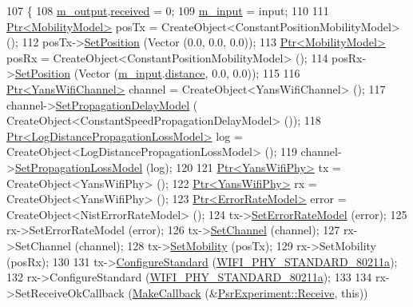 \begin{DoxyCode}
107 \{
108   \hyperlink{classPsrExperiment_ae7fa4520d7fbf118bbf399386b4295c4}{m\_output}.\hyperlink{structPsrExperiment_1_1Output_a51060ffe2dcfb57a68d023b82a16602c}{received} = 0;
109   \hyperlink{classPsrExperiment_a8892dc34592cc5f5f51dbf172078d7a3}{m\_input} = input;
110 
111   \hyperlink{classns3_1_1Ptr}{Ptr<MobilityModel>} posTx = CreateObject<ConstantPositionMobilityModel> ();
112   posTx->\hyperlink{classns3_1_1MobilityModel_ac584b3d5a309709d2f13ed6ada1e7640}{SetPosition} (Vector (0.0, 0.0, 0.0));
113   \hyperlink{classns3_1_1Ptr}{Ptr<MobilityModel>} posRx = CreateObject<ConstantPositionMobilityModel> ();
114   posRx->\hyperlink{classns3_1_1MobilityModel_ac584b3d5a309709d2f13ed6ada1e7640}{SetPosition} (Vector (\hyperlink{classPsrExperiment_a8892dc34592cc5f5f51dbf172078d7a3}{m\_input}.\hyperlink{structPsrExperiment_1_1Input_a74721efa5a648bbae3524197abccb5dd}{distance}, 0.0, 0.0));
115 
116   \hyperlink{classns3_1_1Ptr}{Ptr<YansWifiChannel>} channel = CreateObject<YansWifiChannel> ();
117   channel->\hyperlink{classns3_1_1YansWifiChannel_a51ebdd5a1d897dc46cf9783ac2879b98}{SetPropagationDelayModel} (
      CreateObject<ConstantSpeedPropagationDelayModel> ());
118   \hyperlink{classns3_1_1Ptr}{Ptr<LogDistancePropagationLossModel>} log = 
      CreateObject<LogDistancePropagationLossModel> ();
119   channel->\hyperlink{classns3_1_1YansWifiChannel_ad2f92be1fb34be0075141cbb4f779191}{SetPropagationLossModel} (log);
120 
121   \hyperlink{classns3_1_1Ptr}{Ptr<YansWifiPhy>} tx = CreateObject<YansWifiPhy> ();
122   \hyperlink{classns3_1_1Ptr}{Ptr<YansWifiPhy>} rx = CreateObject<YansWifiPhy> ();
123   \hyperlink{classns3_1_1Ptr}{Ptr<ErrorRateModel>} error = CreateObject<NistErrorRateModel> ();
124   tx->\hyperlink{classns3_1_1WifiPhy_ac363f667899a813bb1331225bc1c1474}{SetErrorRateModel} (error);
125   rx->SetErrorRateModel (error);
126   tx->\hyperlink{classns3_1_1YansWifiPhy_ad2eeb0ab17ef01b26436f7110cccff1d}{SetChannel} (channel);
127   rx->SetChannel (channel);
128   tx->\hyperlink{classns3_1_1WifiPhy_a5bbd6f88cf0a8ac6c7437b278a17a582}{SetMobility} (posTx);
129   rx->SetMobility (posRx);
130 
131   tx->\hyperlink{classns3_1_1WifiPhy_aeafbea9bd8c1ae20f85584f55d868d23}{ConfigureStandard} (\hyperlink{group__wifi_gga1299834f4e1c615af3ca738033b76a49a22db1e8022db2c3450414b86c77b11e4}{WIFI\_PHY\_STANDARD\_80211a});
132   rx->ConfigureStandard (\hyperlink{group__wifi_gga1299834f4e1c615af3ca738033b76a49a22db1e8022db2c3450414b86c77b11e4}{WIFI\_PHY\_STANDARD\_80211a});
133 
134   rx->SetReceiveOkCallback (\hyperlink{group__makecallbackmemptr_ga9376283685aa99d204048d6a4b7610a4}{MakeCallback} (&\hyperlink{classPsrExperiment_a885857fbaba11e93fb276f2b6255e0a0}{PsrExperiment::Receive}, \textcolor{keyword}{this}))

\end{DoxyCode}
